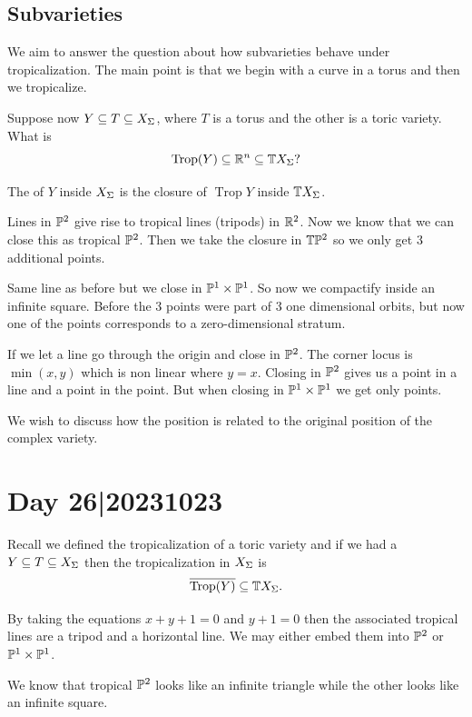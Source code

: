 \documentclass[12pt]{memoir}
\DeclareMathOperator{\Trop}{Trop}
\begin{document}
\subsection{Subvarieties}

We aim to answer the question about how subvarieties behave under tropicalization. The main point is that we begin with a curve in a torus and then we tropicalize.\par 
Suppose now $Y\subseteq T\subseteq X_\Sigma$, where $T$ is a torus and the other is a toric variety. What is 
$$\Trop(Y)\subseteq\bR^n\subseteq \bT X_\Sg?$$

\begin{Def}
    The  of $Y$ inside $X_\Sigma$ is the closure of $\Trop Y$ inside $\mathbb{T} X_\Sigma$. 
\end{Def}

\begin{Ex}
    Lines in $\mathbb{P}^2$ give rise to tropical lines (tripods) in $\mathbb{R}^2$. Now we know that we can close this as tropical $\mathbb{P}^2$. Then we take the closure in $\mathbb{T}\mathbb{P}^2$ so we only get 3 additional points. 
\end{Ex}

\begin{Ex}
    Same line as before but we close in $\mathbb{P}^1\times\mathbb{P}^1$. So now we compactify inside an infinite square. Before the 3 points were part of 3 one dimensional orbits, but now one of the points corresponds to a zero-dimensional stratum.
\end{Ex}

\begin{Ex}
    If we let a line go through the origin and close in $\mathbb{P}^2$. The corner locus is $\min(x,y)$ which is non linear where $y=x$. Closing in $\mathbb{P}^2$ gives us a point in a line and a point in the point. But when closing in $\mathbb{P}^1\times\mathbb{P}^1$ we get only points.
\end{Ex}

We wish to discuss how the position is related to the original position of the complex variety.

\section{Day 26|20231023}

Recall we defined the tropicalization of a toric variety and if we had a $Y\subseteq T\subseteq X_\Sigma$ then the tropicalization in $X_\Sigma$ is 
$$\ov{\Trop(Y)}\subseteq \bT X_\Sg.$$
\begin{Ex}
    By taking the equations $x+y+1=0$ and $y+1=0$ then the associated tropical lines are a tripod and a horizontal line. We may either embed them into $\mathbb{P}^2$ or $\mathbb{P}^1\times\mathbb{P}^1$.\par 
    We know that tropical $\mathbb{P}^2$ looks like an infinite triangle while the other looks like an infinite square.
\end{Ex}
\end{document}
